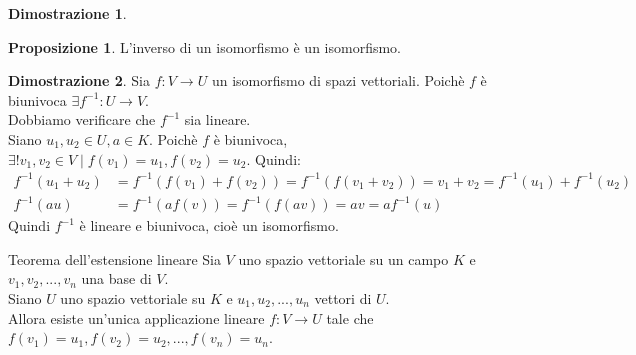 \documentclass[a4paper]{article}
\theoremstyle{definition}
\newtheorem*{dimm}{Dimostrazione}
\newtheorem*{prop}{Proposizione}
\begin{document}
\begin{dimm}
\begin{center}
	\end{center}
\end{dimm}
\begin{prop}
	L'inverso di un isomorfismo è un isomorfismo.
\end{prop}
\begin{dimm}
	Sia $f: V \rightarrow U$ un isomorfismo di spazi vettoriali. Poichè $f$ è biunivoca $\exists f^{-1}: U \rightarrow V$. \\
	Dobbiamo verificare che $f^{-1}$ sia lineare. \\
	Siano $u_1, u_2 \in U, a \in K$. Poichè $f$ è biunivoca, $\exists! v_1, v_2 \in V \mid f(v_1) = u_1, f(v_2) = u_2$.
	Quindi:
	\begin{align*}
		f^{-1}(u_1 + u_2) & = f^{-1}(f(v_1) + f(v_2)) = f^{-1}(f(v_1 + v_2)) = v_1 + v_2 = f^{-1}(u_1) + f^{-1}(u_2) \\
		f^{-1}(au)        & = f^{-1}(af(v)) = f^{-1}(f(av)) = av = af^{-1}(u)
	\end{align*}
	Quindi $f^{-1}$ è lineare e biunivoca, cioè un isomorfismo.
\end{dimm}
\begin{teo}{Teorema dell'estensione lineare}{}
	Sia $V$ uno spazio vettoriale su un campo $K$ e $v_1, v_2, ..., v_n$ una base di $V$. \\
	Siano $U$ uno spazio vettoriale su $K$ e $u_1, u_2, ..., u_n$ vettori di $U$. \\
	Allora esiste un'unica applicazione lineare $f: V \rightarrow U$ tale che $f(v_1) = u_1, f(v_2) = u_2, ..., f(v_n) = u_n$.
\end{teo}
\end{document}
